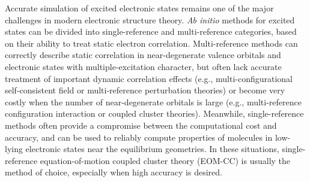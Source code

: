 Accurate simulation of excited electronic states remains one of the major
challenges in modern electronic structure theory. 
{\it Ab initio}\/ methods for excited states can be divided into
single-reference and multi-reference categories, based on their ability to
treat static electron correlation.
Multi-reference methods can correctly describe static correlation in
near-degenerate valence orbitals and electronic states with multiple-excitation
character, but often lack accurate treatment of important dynamic correlation
effects (e.g., multi-configurational self-consistent field or multi-reference
perturbation theories)
\cite{Knowles:1985p259,Werner:1985p5053,Wolinski:1987p225,Hirao:1992p374,Finley:1998p299,Andersson:1990p5483,Andersson:1992p1218,Werner:1996p645,Angeli:2001p10252,Angeli:2001p297}
or become very costly when the number of near-degenerate orbitals is large
(e.g., multi-reference configuration interaction or coupled cluster theories).
\cite{Mukherjee:1977p955,Lindgren:1978p33,Siegbahn:1980p1647,Jeziorski:1981p1668,Werner:1988p5803,Mahapatra:1998p157,Mahapatra:1999p6171,Pittner:2003p10876,Evangelista:2007p024102,Datta:2011p214116,Evangelista:2011p114102,Kohn:2013p176,Nooijen:2014p081102}
Meanwhile,
single-reference methods
\cite{Foresman:1992p135,Sherrill:1999p143,Geertsen:1989p57,Comeau:1993p414,Stanton:1993p7029,Krylov:2008p433,Crawford:2000p33,Shavitt:2009,Sekino:1984p255,Koch:1990p3345,Koch:1990p3333,Nooijen:1997p6441,Nooijen:1997p6812,Nakatsuji:1978p2053,Nakatsuji:1979p329}
often provide a compromise between the computational
cost and accuracy, and can be used to reliably compute properties of molecules
in low-lying electronic states near the equilibrium geometries. In these
situations, single-reference equation-of-motion coupled cluster theory
(EOM-CC)
\cite{Geertsen:1989p57,Comeau:1993p414,Stanton:1993p7029,Krylov:2008p433,Crawford:2000p33,Shavitt:2009}
is usually the method of choice, especially when high accuracy
is desired. 

